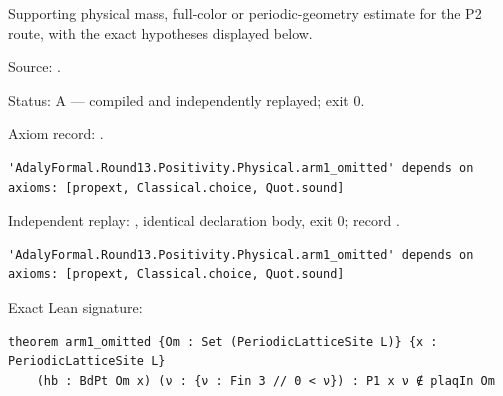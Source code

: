 \begin{theorem}[bp-486]
\label{bp-486}
\uses{}
\leanok
Supporting physical mass, full-color or periodic-geometry estimate for the P2 route, with the exact hypotheses displayed below.

\par Source: \texttt{}.
\par Status: A — compiled and independently replayed; exit 0.
\par Axiom record: \texttt{}.
\begin{verbatim}
'AdalyFormal.Round13.Positivity.Physical.arm1_omitted' depends on axioms: [propext, Classical.choice, Quot.sound]
\end{verbatim}
\par Independent replay: \texttt{}, identical declaration body, exit 0; record \texttt{}.
\begin{verbatim}
'AdalyFormal.Round13.Positivity.Physical.arm1_omitted' depends on axioms: [propext, Classical.choice, Quot.sound]
\end{verbatim}
\par Exact Lean signature:
\begin{verbatim}
theorem arm1_omitted {Om : Set (PeriodicLatticeSite L)} {x : PeriodicLatticeSite L}
    (hb : BdPt Om x) (ν : {ν : Fin 3 // 0 < ν}) : P1 x ν ∉ plaqIn Om
\end{verbatim}
\end{theorem}


